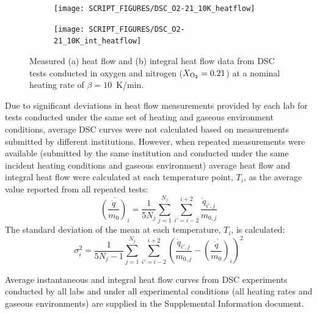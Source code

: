 \documentclass{book}
\begin{document}
\begin{figure}[p]
\centering
\begin{subfigure}[b]{0.85\textwidth}
   \texttt{[image: SCRIPT\_FIGURES/DSC\_O2-21\_10K\_heatflow]}
   \caption{}
   \label{Fig:DSC_O2-21_10K_heatflow}
\end{subfigure}

\begin{subfigure}[b]{0.85\textwidth}
   \texttt{[image: SCRIPT\_FIGURES/DSC\_O2-21\_10K\_int\_heatflow]}
   \caption{}
   \label{Fig:DSC_O2-21_10K_int_heatflow}
\end{subfigure}

  \caption{Measured (a) heat flow and (b) integral heat flow data from DSC tests conducted in oxygen and nitrogen ($X_{\rm O_2}=0.21$) at a nominal heating rate of $\beta=10$~K/min.}
  \label{Fig:DSC_O2-21_10K}
\end{figure}

\newpage
Due to significant deviations  in heat flow measurements provided by each lab for tests conducted under the same set of heating and gaseous environment conditions, average DSC curves were not calculated based on measurements submitted by different institutions. However, when repeated measurements were available (submitted by the same institution and conducted under the same incident heating conditions and gaseous environment) average heat flow and integral heat flow were calculated at each temperature point, $T_i$, as the average value reported from all repeated tests:
\begin{equation}
   \overline{ \left( \frac{\dot{q}}{m_0} \right)_i } = \frac{1}{5N_j} \sum_{j=1}^{N_j} \sum_{i'=i-2}^{i+2} \frac{\dot{q}_{i',j}}{m_{0,j}}
\end{equation}
The standard deviation of the mean at each temperature, $T_i$, is calculated:
\begin{equation}
   \sigma_i^2 = \frac{1}{5N_j-1} \sum_{j=1}^{N_j} \sum_{i'=i-2}^{i+2} \left( \frac{\dot{q}_{i',j}}{m_{0,j}} - \overline{ \left( \frac{\dot{q}}{m_0} \right)_i }   \right)^2
\end{equation}


Average instantaneous and integral heat flow curves from DSC experiments conducted by all labs and under all experimental conditions (all heating rates and gaseous environments) are supplied in the Supplemental Information document.
\end{document}
